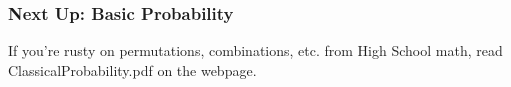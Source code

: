 \documentclass[handout]{beamer}
\begin{document}
\begin{frame}
  \frametitle{Next Up: Basic Probability}
    If you're rusty on permutations, combinations, etc. from High School math, read ClassicalProbability.pdf on the webpage.
\end{frame}
\end{document}
